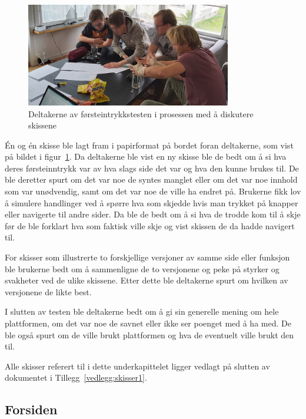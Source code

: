 
\begin{figure}[H]
\includegraphics[width=0.8\textwidth]{Illustrasjoner/skissetest-bilde.jpg}
\centering
\caption{Deltakerne av førsteintrykkstesten i prosessen med å diskutere skissene}
\label{fig:skissetest}
\end{figure}

Én og én skisse ble lagt fram i papirformat på bordet foran deltakerne, som vist på bildet i figur~\ref{fig:skissetest}. Da deltakerne ble vist en ny skisse ble de bedt om å si hva deres førsteinntrykk var av hva slags side det var og hva den kunne brukes til. De ble deretter spurt om det var noe de syntes manglet eller om det var noe innhold som var unødvendig, samt om det var noe de ville ha endret på. Brukerne fikk lov å simulere handlinger ved å spørre hva som skjedde hvis man trykket på knapper eller navigerte til andre sider. Da ble de bedt om å si hva de trodde kom til å skje før de ble forklart hva som faktisk ville skje og vist skissen de da hadde navigert til.

For skisser som illustrerte to forskjellige versjoner av samme side eller funksjon ble brukerne bedt om å sammenligne de to versjonene og peke på styrker og svakheter ved de ulike skissene. Etter dette ble deltakerne spurt om hvilken av versjonene de likte best.

I slutten av testen ble deltakerne bedt om å gi sin generelle mening om hele plattformen, om det var noe de savnet eller ikke ser poenget med å ha med. De ble også spurt om de ville brukt plattformen og hva de eventuelt ville brukt den til.

Alle skisser referert til i dette underkapittelet ligger vedlagt på slutten av dokumentet i Tillegg~\ref{vedlegg:skisser1}.

\subsection{Forsiden}

